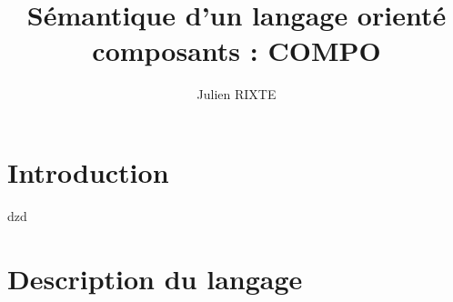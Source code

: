 \documentclass[11pt,a4paper,fleqn]{report}
\begin{document}
\title{Sémantique d'un langage orienté composants : COMPO}
\author{Julien RIXTE}
\maketitle

\tableofcontents

\newtheorem{prop}{Proposition}

\chapter{Introduction}dzd

\chapter{Description du langage}
\end{document}
